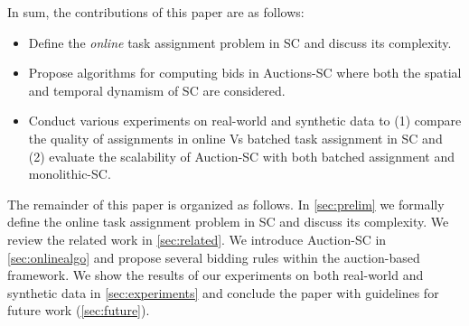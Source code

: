 In sum, the contributions of this paper are as follows:

\begin{itemize}
\item Define the \textit{online} task assignment problem in SC and discuss its complexity.
\item Propose algorithms for computing bids in Auctions-SC where both the spatial and temporal dynamism of SC are considered.
\item Conduct various experiments on real-world and synthetic data to (1) compare the quality of assignments in online Vs batched task assignment in SC and (2) evaluate the scalability of Auction-SC with both batched assignment and monolithic-SC.
\end{itemize}


The remainder of this paper is organized as follows. In \cref{sec:prelim} we formally define the online task assignment problem in SC and discuss its complexity. We review the related work in \cref{sec:related}. We introduce Auction-SC in \cref{sec:onlinealgo} and propose several bidding rules within the auction-based framework. We show the results of our experiments on both real-world and synthetic data in \cref{sec:experiments} and conclude the paper with guidelines for future work (\cref{sec:future}).